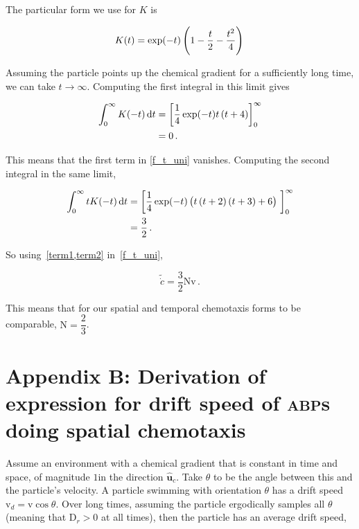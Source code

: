 \documentclass[a4wide,11pt]{article}
\begin{document}
The particular form we use for $K$ is

\begin{equation}
    K(t) = \exp(-t) \del{1 - \dfrac{t}{2} - \dfrac{t^2}{4}} \,
    \label{K}
\end{equation}

Assuming the particle points up the chemical gradient for a sufficiently long time, we can take $t \to \infty$. Computing the first integral in this limit gives

\begin{equation}
    \begin{aligned}
        \int_0^\infty K(-t) \dif t &= \left[ \dfrac{1}{4} \exp(-t) t \del{t + 4} \right]_0^\infty \\
                                  &= 0 \,.
    \end{aligned}
    \label{term1}
\end{equation}

This means that the first term in \cref{f_t_uni} vanishes. Computing the second integral in the same limit,

\begin{equation}
    \begin{aligned}
        \int_0^\infty t K(-t) \dif t &= \left[ \dfrac{1}{4} \exp(-t) \del{t \del{t + 2} \del{t + 3} + 6} \ \right]_0^\infty \\
                                    &= \dfrac{3}{2} \,.
    \end{aligned}
    \label{term2}
\end{equation}

So using~\cref{term1,term2} in~\cref{f_t_uni},

\begin{equation}
    \tilde{\dot{c}} = \dfrac{3}{2} \mathrm{N} \mathrm{v} \,.
    \label{f_t_uni_subsed}
\end{equation}

This means that for our spatial and temporal chemotaxis forms to be comparable, $\mathrm{N} = \dfrac{2}{3}$.

\section*{Appendix B: Derivation of expression for drift speed of \textsc{abp}s doing spatial chemotaxis}

Assume an environment with a chemical gradient that is constant in time and space, of magnitude $1$in the direction $\hat{\mathbf{u}}_c$. Take $\theta$ to be the angle between this and the particle's velocity. A particle swimming with orientation $\theta$ has a drift speed $\mathrm{v}_d = \mathrm{v} \cos \theta$. Over long times, assuming the particle ergodically samples all $\theta$ (meaning that $\mathrm{D}_r > 0$ at all times), then the particle has an average drift speed,
\end{document}
